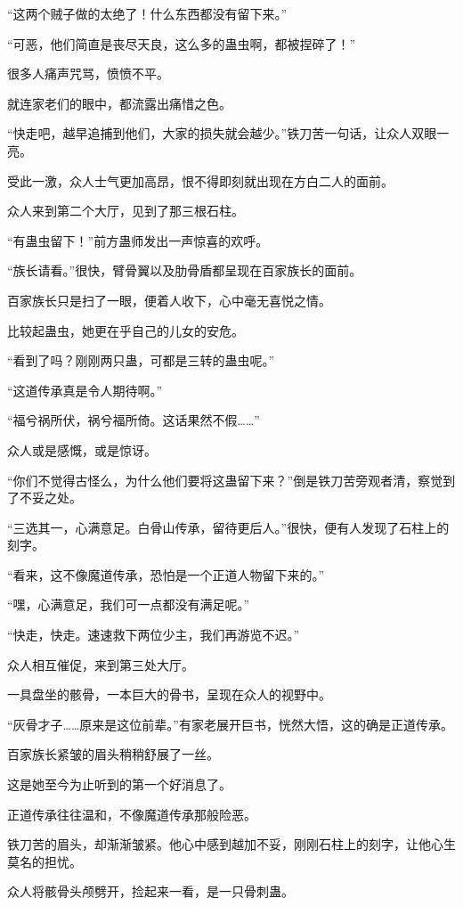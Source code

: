 \begin{this_body}
“这两个贼子做的太绝了！什么东西都没有留下来。”

“可恶，他们简直是丧尽天良，这么多的蛊虫啊，都被捏碎了！”

很多人痛声咒骂，愤愤不平。

就连家老们的眼中，都流露出痛惜之色。

“快走吧，越早追捕到他们，大家的损失就会越少。”铁刀苦一句话，让众人双眼一亮。

受此一激，众人士气更加高昂，恨不得即刻就出现在方白二人的面前。

众人来到第二个大厅，见到了那三根石柱。

“有蛊虫留下！”前方蛊师发出一声惊喜的欢呼。

“族长请看。”很快，臂骨翼以及肋骨盾都呈现在百家族长的面前。

百家族长只是扫了一眼，便着人收下，心中毫无喜悦之情。

比较起蛊虫，她更在乎自己的儿女的安危。

“看到了吗？刚刚两只蛊，可都是三转的蛊虫呢。”

“这道传承真是令人期待啊。”

“福兮祸所伏，祸兮福所倚。这话果然不假……”

众人或是感慨，或是惊讶。

“你们不觉得古怪么，为什么他们要将这蛊留下来？”倒是铁刀苦旁观者清，察觉到了不妥之处。

“三选其一，心满意足。白骨山传承，留待更后人。”很快，便有人发现了石柱上的刻字。

“看来，这不像魔道传承，恐怕是一个正道人物留下来的。”

“嘿，心满意足，我们可一点都没有满足呢。”

“快走，快走。速速救下两位少主，我们再游览不迟。”

众人相互催促，来到第三处大厅。

一具盘坐的骸骨，一本巨大的骨书，呈现在众人的视野中。

“灰骨才子……原来是这位前辈。”有家老展开巨书，恍然大悟，这的确是正道传承。

百家族长紧皱的眉头稍稍舒展了一丝。

这是她至今为止听到的第一个好消息了。

正道传承往往温和，不像魔道传承那般险恶。

铁刀苦的眉头，却渐渐皱紧。他心中感到越加不妥，刚刚石柱上的刻字，让他心生莫名的担忧。

众人将骸骨头颅劈开，捡起来一看，是一只骨刺蛊。


\end{this_body}
